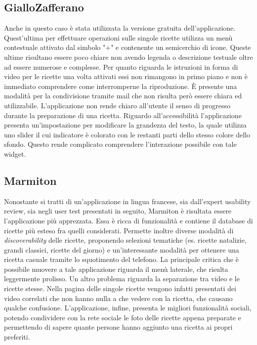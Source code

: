\subsection{GialloZafferano}
Anche in questo caso è stata utilizzata la versione gratuita dell'applicazione.
Quest'ultima per effettuare operazioni sulle singole ricette utilizza un menù
contestuale attivato dal simbolo "+" e contenente un semicerchio di icone.
Queste ultime risultano essere poco chiare non avendo legenda o descrizione
testuale oltre ad essere numerose e complesse.  Per quanto riguarda le
istruzioni in forma di video per le ricette una volta attivati essi non
rimangono in primo piano e non è immediato comprendere come interromperne la
riproduzione.  È presente una modalità per la condivisione tramite mail che non
risulta però essere chiara ed utilizzabile.  L'applicazione non rende chiaro
all'utente il senso di progresso durante la preparazione di una ricetta.
Riguardo all'accessibilità l'applicazione presenta un'impostazione per
modificare la grandezza del testo, la quale utilizza uno slider il cui
indicatore è colorato con le restanti parti dello stesso colore dello sfondo.
Questo rende complicato comprendere l'interazione possibile con tale widget.

\subsection{Marmiton}
Nonostante si tratti di un'applicazione in lingua francese, sia dall'expert
usability review, sia negli user test presentati in seguito, Marmiton è
risultata essere l'applicazione più apprezzata.  Essa è ricca di funzionalità e
contiene il database di ricette più esteso fra quelli considerati.  Permette
inoltre diverse modalità di \emph{discoverability} delle ricette, proponendo
selezioni tematiche (es. ricette natalizie, grandi classici, ricette del giorno)
e un'interessante modalità per ottenere una ricetta casuale tramite lo
squotimento del telefono.  La principale critica che è possibile muovere a tale
applicazione riguarda il menù laterale, che risulta leggermente prolisso. Un
altro problema riguarda la separazione tra video e le ricette stesse.  Nella
pagina delle singole ricette vengono infatti presentati dei video correlati che
non hanno nulla a che vedere con la ricetta, che causano qualche confusione.
L'applicazione, infine, presenta le migliori funzionalità sociali, potendo
condividere con la rete sociale le foto delle ricette appena preparate e
permettendo di sapere quante persone hanno aggiunto una ricetta ai propri
preferiti.

